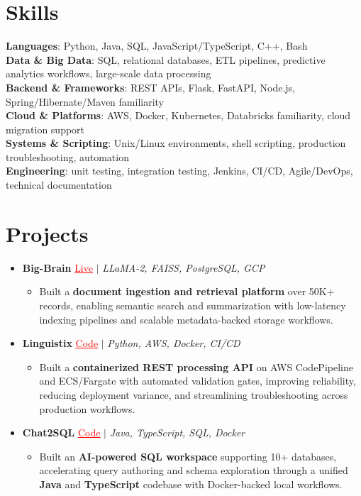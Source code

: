 \documentclass[letterpaper,10pt]{article}
\newcommand{\resumeItem}[1]{\item\small{{#1 \vspace{-2pt}}}}
\newcommand{\resumeProjectHeading}[1]{\item \small #1 \vspace{-2pt}}
\newcommand{\resumeSubHeadingListStart}{\begin{itemize}[leftmargin=0.0in, label={}]}
\newcommand{\resumeSubHeadingListEnd}{\end{itemize}}
\newcommand{\resumeProjItemListStart}{\begin{itemize}[leftmargin=0.15in,label=\textbullet,itemsep=0pt,topsep=0pt,parsep=0pt,partopsep=0pt]}
\newcommand{\resumeProjItemListEnd}{\end{itemize}\vspace{-4pt}}
\begin{document}
\section{Skills}
\begin{itemize}[leftmargin=0.15in, label={}]
\small{\item{
\textbf{Languages}: Python, Java, SQL, JavaScript/TypeScript, C++, Bash \\
\textbf{Data \& Big Data}: SQL, relational databases, ETL pipelines, predictive analytics workflows, large-scale data processing \\
\textbf{Backend \& Frameworks}: REST APIs, Flask, FastAPI, Node.js, Spring/Hibernate/Maven familiarity \\
\textbf{Cloud \& Platforms}: AWS, Docker, Kubernetes, Databricks familiarity, cloud migration support \\
\textbf{Systems \& Scripting}: Unix/Linux environments, shell scripting, production troubleshooting, automation \\
\textbf{Engineering}: unit testing, integration testing, Jenkins, CI/CD, Agile/DevOps, technical documentation
}}
\end{itemize}
\vspace{-6pt}
\section{Projects}
\resumeSubHeadingListStart
\vspace{-2pt}
\resumeProjectHeading{\textbf{Big-Brain} {\href{https://big-brain-pied.vercel.app/}{\textcolor{red}{\underline{Live}}}} $|$ \emph{LLaMA-2, FAISS, PostgreSQL, GCP}}
\resumeProjItemListStart
\resumeItem{Built a \textbf{document ingestion and retrieval platform} over 50K+ records, enabling semantic search and summarization with low-latency indexing pipelines and scalable metadata-backed storage workflows.}
\resumeProjItemListEnd
\vspace{3pt}

\resumeProjectHeading{\textbf{Linguistix} {\href{https://github.com/SAHAJ-BHADJA/Linguistix}{\textcolor{red}{\underline{Code}}}} $|$ \emph{Python, AWS, Docker, CI/CD}}
\resumeProjItemListStart
\resumeItem{Built a \textbf{containerized REST processing API} on AWS CodePipeline and ECS/Fargate with automated validation gates, improving reliability, reducing deployment variance, and streamlining troubleshooting across production workflows.}
\resumeProjItemListEnd
\vspace{3pt}

\resumeProjectHeading{\textbf{Chat2SQL} {\href{https://github.com/SAHAJ-BHADJA/Chat2SQL}{\textcolor{red}{\underline{Code}}}} $|$ \emph{Java, TypeScript, SQL, Docker}}
\resumeProjItemListStart
\resumeItem{Built an \textbf{AI-powered SQL workspace} supporting 10+ databases, accelerating query authoring and schema exploration through a unified \textbf{Java} and \textbf{TypeScript} codebase with Docker-backed local workflows.}
\resumeProjItemListEnd
\resumeSubHeadingListEnd
\end{document}
